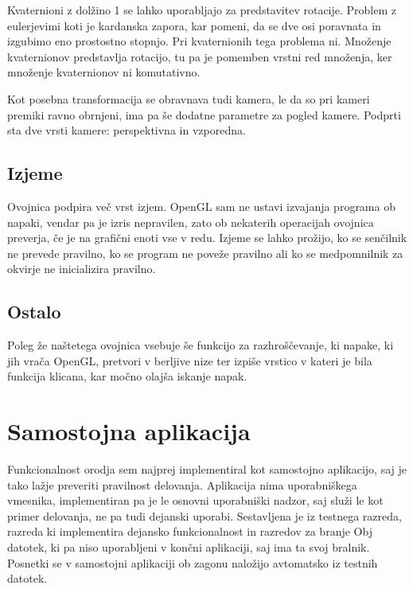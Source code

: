 \documentclass[a4paper, 12pt]{book}
\begin{document}
Kvaternioni z dolžino 1 se lahko uporabljajo za predstavitev rotacije. Problem z eulerjevimi koti je kardanska zapora, kar pomeni, da se dve osi poravnata in izgubimo eno prostostno stopnjo. Pri kvaternionih tega problema ni. Množenje kvaternionov predstavlja rotacijo, tu pa je pomemben vrstni red množenja, ker množenje kvaternionov ni komutativno.

Kot posebna transformacija se obravnava tudi kamera, le da so pri kameri premiki ravno obrnjeni, ima pa še dodatne parametre za pogled kamere. Podprti sta dve vrsti kamere: perspektivna in vzporedna.


\subsection*{Izjeme}
Ovojnica podpira več vrst izjem. OpenGL sam ne ustavi izvajanja programa ob napaki, vendar pa je izris nepravilen, zato ob nekaterih operacijah ovojnica preverja, če je na grafični enoti vse v redu. Izjeme se lahko prožijo, ko se senčilnik ne prevede pravilno, ko se program ne poveže pravilno ali ko se medpomnilnik za okvirje ne inicializira pravilno.

\subsection*{Ostalo}

Poleg že naštetega ovojnica vsebuje še funkcijo za razhroščevanje, ki napake, ki jih vrača OpenGL, pretvori v berljive nize ter izpiše vrstico v kateri je bila funkcija klicana, kar močno olajša iskanje napak.

\section{Samostojna aplikacija}

Funkcionalnost orodja sem najprej implementiral kot samostojno aplikacijo, saj je tako lažje preveriti pravilnost delovanja. Aplikacija nima uporabniškega vmesnika, implementiran pa je le osnovni uporabniški nadzor, saj služi le kot primer delovanja, ne pa tudi dejanski uporabi. Sestavljena je iz testnega razreda, razreda ki implementira dejansko funkcionalnost in razredov za branje Obj datotek, ki pa niso uporabljeni v končni aplikaciji, saj ima ta svoj bralnik. Posnetki se v samostojni aplikaciji ob zagonu naložijo avtomatsko iz testnih datotek.
\end{document}
